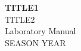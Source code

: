 



  \begin{titlepage}
    \vspace*{\fill}
    \begin{center}
      \huge{{\bf TITLE1}}\\[0.4cm]
      \huge{TITLE2}\\[0.4cm]
      \LARGE{Laboratory Manual}\\[0.4cm]
      \large{SEASON YEAR}
    \end{center}
    \vspace*{\fill}
  \end{titlepage}
\maketitle

\begin{spacing}{0.5}
\tableofcontents
\end{spacing}

